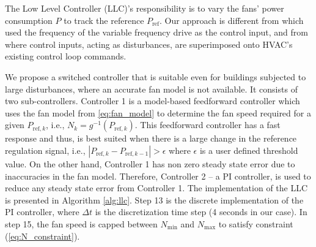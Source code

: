 The Low Level Controller (LLC)'s responsibility is to vary the fans' power consumption $P$ to track the reference $P_{\text{ref}}$. 
Our approach is different from \cite{Macdonald:2014pjm} which used the frequency of the variable frequency drive as the control input, and from \cite{Lin:2015exp} where control inputs, acting as disturbances, are superimposed onto HVAC's existing control loop commands.

We propose a switched controller that is suitable even for buildings subjected to large disturbances, where an accurate fan model is not available. 
It consists of two sub-controllers. 
Controller 1 is a model-based feedforward controller which uses the fan model from \eqref{eq:fan_model} to determine the fan speed required for a given $P_{\text{ref},k}$, i.e., $N_k = g^{-1}(P_{\text{ref},k})$. 
This feedforward controller has a fast response and thus, is best suited when there is a large change in the reference regulation signal, i.e., $|P_{\text{ref},k} - P_{\text{ref},k-1}|>\epsilon$ where $\epsilon$ is a user defined threshold value. 
On the other hand, Controller 1 has non zero steady state error due to inaccuracies in the fan model. 
Therefore, Controller 2 -- a PI controller, is used to reduce any steady state error from Controller 1. 
The implementation of the LLC is presented in Algorithm \ref{alg:llc}.
Step 13 is the discrete implementation of the PI controller, where $\Delta t$ is the discretization time step (4 seconds in our case).
In step 15, the fan speed is capped between $N_\text{min}$ and $N_\text{max}$ to satisfy constraint (\ref{eq:N_constraint}).

